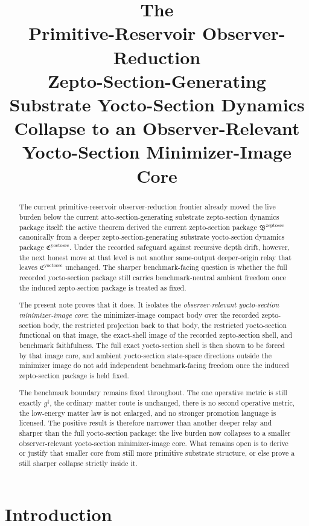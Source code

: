 \documentclass[11pt]{article}
\title{\textbf{The \TheoryName{}}\\[0.4em]
\large Primitive-Reservoir Observer-Reduction\\
\large Zepto-Section-Generating Substrate Yocto-Section Dynamics\\
\large Collapse to an Observer-Relevant Yocto-Section Minimizer-Image Core}
\author{}
\date{}
\newcommand{\CompletedMetric}{g^{\sharp}}
\newcommand{\ZeptoSectionPackage}{\mathfrak B^{\mathrm{zeptosec}}}
\newcommand{\YoctoSectionPackage}{\mathfrak C^{\mathrm{yoctosec}}}
\begin{document}
\maketitle

\begin{abstract}
The current primitive-reservoir observer-reduction frontier already moved the live burden below the current atto-section-generating substrate zepto-section dynamics package itself: the active theorem derived the current zepto-section package \(\ZeptoSectionPackage\) canonically from a deeper zepto-section-generating substrate yocto-section dynamics package \(\YoctoSectionPackage\). Under the recorded safeguard against recursive depth drift, however, the next honest move at that level is not another same-output deeper-origin relay that leaves \(\YoctoSectionPackage\) unchanged. The sharper benchmark-facing question is whether the full recorded yocto-section package still carries benchmark-neutral ambient freedom once the induced zepto-section package is treated as fixed.

The present note proves that it does. It isolates the \emph{observer-relevant yocto-section minimizer-image core}: the minimizer-image compact body over the recorded zepto-section body, the restricted projection back to that body, the restricted yocto-section functional on that image, the exact-shell image of the recorded zepto-section shell, and benchmark faithfulness. The full exact yocto-section shell is then shown to be forced by that image core, and ambient yocto-section state-space directions outside the minimizer image do not add independent benchmark-facing freedom once the induced zepto-section package is held fixed.

The benchmark boundary remains fixed throughout. The one operative metric is still exactly \(\CompletedMetric\), the ordinary matter route is unchanged, there is no second operative metric, the low-energy matter law is not enlarged, and no stronger promotion language is licensed. The positive result is therefore narrower than another deeper relay and sharper than the full yocto-section package: the live burden now collapses to a smaller observer-relevant yocto-section minimizer-image core. What remains open is to derive or justify that smaller core from still more primitive substrate structure, or else prove a still sharper collapse strictly inside it.
\end{abstract}

\section{Introduction}
\end{document}
